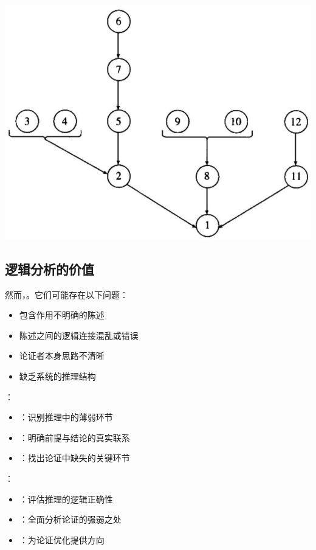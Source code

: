 \begin{center}
\includegraphics[width=\textwidth]{images/2025_05_15_6a28331d5e7c993ad07ag-076.jpg}
\end{center}

\subsection{逻辑分析的价值}

然而，。它们可能存在以下问题：
\begin{itemize}
  \item 包含作用不明确的陈述
  \item 陈述之间的逻辑连接混乱或错误
  \item 论证者本身思路不清晰
  \item 缺乏系统的推理结构
\end{itemize}

\begin{theorembox}[title=图示法逻辑分析的功能]
：
\begin{itemize}
  \item {}：识别推理中的薄弱环节
  \item {}：明确前提与结论的真实联系
  \item {}：找出论证中缺失的关键环节
\end{itemize}

：
\begin{itemize}
  \item {}：评估推理的逻辑正确性
  \item {}：全面分析论证的强弱之处
  \item {}：为论证优化提供方向
\end{itemize}
\end{theorembox}

